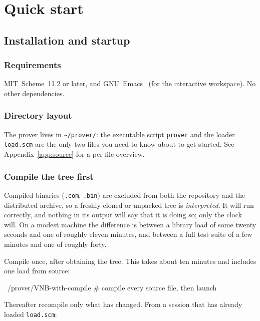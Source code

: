 \section{Quick start}
\label{sec:quickstart-chap}

\subsection{Installation and startup}

\subsubsection{Requirements}

MIT~Scheme~11.2 or later, and GNU~Emacs~\cite{Emacs} (for the interactive workspace).
No other dependencies.

\subsubsection{Directory layout}

The prover lives in \texttt{\textasciitilde/prover/}: the executable
script \texttt{prover} and the loader \texttt{load.scm} are the only
two files you need to know about to get started.  See
Appendix~\ref{app:source} for a per-file overview.

\subsubsection{Compile the tree first}
\label{sec:compile-first}

Compiled binaries (\texttt{.com}, \texttt{.bin}) are excluded from both the
repository and the distributed archive, so a freshly cloned or unpacked tree is
\emph{interpreted}.  It will run correctly, and nothing in its output will say
that it is doing so; only the clock will.  On a modest machine the difference is
between a library load of some twenty seconds and one of roughly eleven minutes,
and between a full test suite of a few minutes and one of roughly forty.

Compile once, after obtaining the tree.  This takes about ten minutes and
includes one load from source:

\begin{VNBsnip}
~/prover/VNB-with-compile    # compile every source file, then launch
\end{VNBsnip}

Thereafter recompile only what has changed.  From a session that has already
loaded \texttt{load.scm}:

